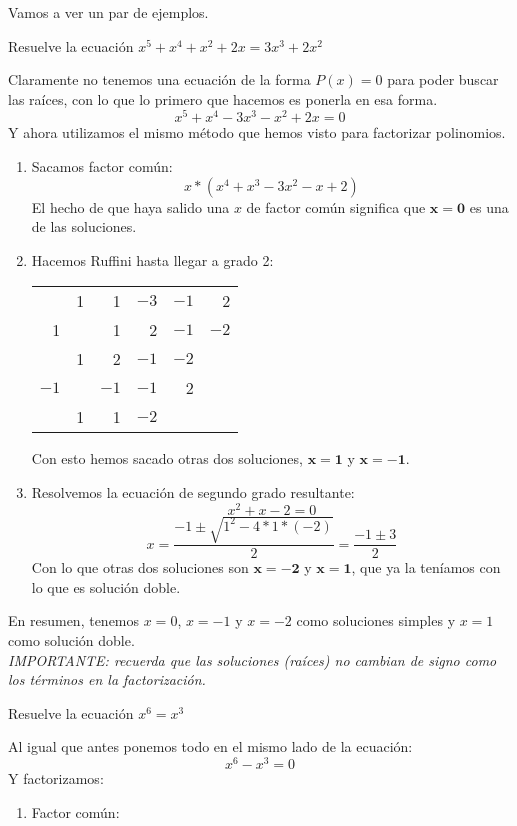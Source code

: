 \documentclass[a4paper,11pt,answers]{exam}
\begin{document}
Vamos a ver un par de ejemplos.
\begin{questions}
\question Resuelve la ecuación $x^5+x^4+x^2+2x = 3x^3 +2x^2$
  \begin{solution}
    Claramente no tenemos una ecuación de la forma $P(x) = 0$ para poder buscar las raíces, con lo que lo primero que hacemos es ponerla en esa forma.
    \[x^5 + x^4 -3x^3 - x^2 + 2x = 0\]
    Y ahora utilizamos el mismo método que hemos visto para factorizar polinomios.
    \begin{enumerate}
    \item Sacamos factor común:
      \[x*(x^4 + x^3 - 3x^2 -x + 2)\]
      El hecho de que haya salido una $x$ de factor común significa que
      $\boldsymbol{x= 0}$ es una de las soluciones.
    \item Hacemos Ruffini hasta llegar a grado 2:
      \begin{center}
        \begin{tabular}{r|rrrrr}
          &1&1&$-3$&$-1$&2\\
          1&&1&2&$-1$&$-2$\\
          \hline
          &1&2&$-1$&$-2$&\\
          $-1$&&$-1$&$-1$&2&\\
          \hline
          &1&1&$-2$&&
        \end{tabular}
      \end{center}
      Con esto hemos sacado otras dos soluciones, $\boldsymbol{x=1}$ y $\boldsymbol{x=-1}$.
    \item Resolvemos la ecuación de segundo grado resultante:
      \[x^2 + x - 2 = 0\]
      \[x = \frac{-1 \pm \sqrt{1^2 - 4*1*(-2)}}{2} = \frac{-1 \pm 3}{2}\]
      Con lo que otras dos soluciones son $\boldsymbol{x=-2}$ y $\boldsymbol{x=1}$, que ya la
      teníamos con lo que es solución doble.
    \end{enumerate}
    En resumen, tenemos $x=0$, $x=-1$ y $x= -2$ como soluciones simples y $x=1$ como solución
    doble.\\
    \large{\emph{IMPORTANTE: recuerda que las soluciones (raíces) no cambian de signo como los términos en la factorización.}}
  \end{solution}
\question Resuelve la ecuación $x^6 = x^3$
  \begin{solution}
    Al igual que antes ponemos todo en el mismo lado de la ecuación:
    \[x^6 - x^3 = 0\]
    Y factorizamos:
    \begin{enumerate}
    \item Factor común:

\end{enumerate}
\end{solution}
\end{questions}
\end{document}
